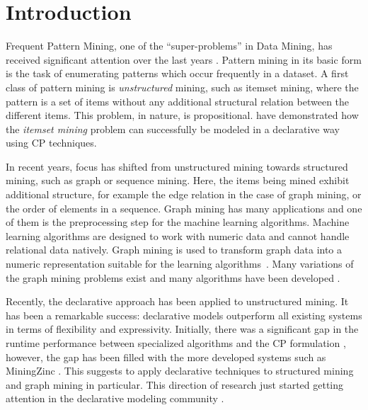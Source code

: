 \section{Introduction}
Frequent Pattern Mining, one of the ``super-problems'' in Data Mining, has received significant attention over the last years \citep{pattern_mining_book}. Pattern mining in its basic form is the task of enumerating patterns which occur frequently in a dataset.
A first class of pattern mining is \emph{unstructured} mining, such as itemset mining, where the pattern is a set of items without any additional structural relation between the different items.
This problem, in nature, is propositional.
\citet{tias_original} have demonstrated how the \emph{itemset mining} problem can successfully be modeled in a declarative way using CP techniques.

In recent years, focus has shifted from unstructured mining towards structured mining, such as graph or sequence mining.
Here, the items being mined exhibit additional structure, for example the edge relation in the case of graph mining, or the order of elements in a sequence. Graph mining has many applications and one of them is the preprocessing step for the machine learning algorithms. Machine learning algorithms are designed to work with numeric data and cannot handle relational data natively. Graph mining is used to transform graph data into a numeric representation suitable for the learning algorithms~\citep{pattern_mining_classification}. Many variations of the graph mining problems exist \citep{subtree_overview} and many algorithms have been developed \citep{gspan,theta_subsumption}.

Recently, the declarative approach has been applied to unstructured mining. It has been a remarkable success: declarative models outperform all existing systems in terms of flexibility and expressivity. Initially, there was a significant gap in the runtime performance between specialized algorithms and the CP formulation \citep{tias_original,mining_cp_extra}, however, the gap has been filled with the more developed systems such as MiningZinc \citep{tias_declarative_pattern_mining}. 
This suggests to apply declarative techniques to structured mining and graph mining in particular. This direction of research just started getting attention in the declarative modeling community \citep{cp_sequence_mining,ilp_graph_mining}. 


